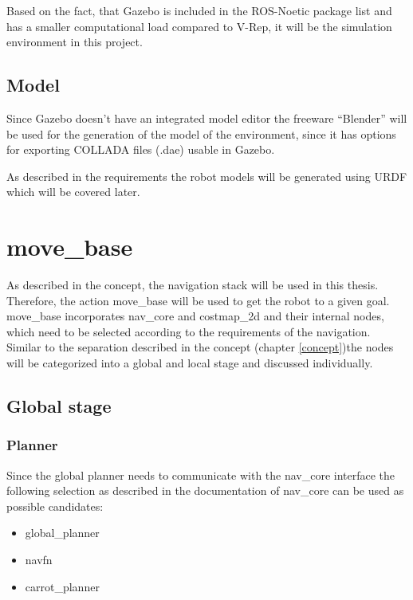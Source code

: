 Based on the fact, that Gazebo is included in the ROS-Noetic package list and has a smaller computational load compared to V-Rep, it will be the simulation environment in this project.

\subsection{Model}
Since Gazebo doesn't have an integrated model editor the freeware ``Blender'' will be used for the generation of the model of the environment, since it has options for exporting COLLADA files (.dae) usable in Gazebo.

As described in the requirements the robot models will be generated using URDF which will be covered later.

\section{move\_base}

As described in the concept, the navigation stack will be used in this thesis. Therefore, the action move\_base will be used to get the robot to a given goal.\\
 move\_base incorporates nav\_core and costmap\_2d and their internal nodes, which need to be selected according to the requirements of the navigation.\\
Similar to the separation described in the concept (chapter \ref{concept})the nodes will be categorized into a global and local stage and discussed individually.

\subsection{Global stage}
\label{globalconfig}
\subsubsection{Planner}

Since the global planner needs to communicate with the nav\_core interface  the following selection as described in the documentation of nav\_core can be used as possible candidates\cite{navcore}:

\begin{itemize}
	\item global\_planner
	\item navfn
	\item carrot\_planner
\end{itemize}


